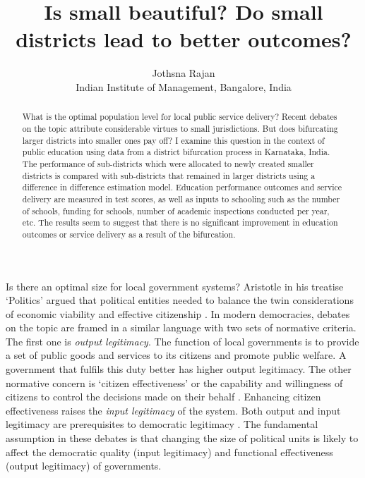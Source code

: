 \documentclass[12pt, a4paper]{article}
\title{Is small beautiful? Do small districts lead to better outcomes?}
\author{Jothsna Rajan \\
	\small{Indian Institute of Management, Bangalore, India}}
\begin{document}

	\maketitle
\begin{abstract}
	What is the optimal population level for local public service delivery? Recent debates on the topic attribute considerable virtues to small jurisdictions. But does bifurcating larger districts into smaller ones pay off? I examine this question in the context of public education using data from a district bifurcation process in Karnataka, India. The performance of sub-districts which were allocated to newly created smaller districts is compared with sub-districts that remained in larger districts using a difference in difference estimation model. Education performance outcomes and service delivery are measured in test scores, as well as inputs to schooling such as the number of schools, funding for schools, number of academic inspections conducted per year, etc. The results seem to suggest that there is no significant improvement in education outcomes or service delivery as a result of the bifurcation. 
\end{abstract}
\paragraph{} Is there an optimal size for local government systems? Aristotle in his treatise `Politics' argued that political entities needed to balance the twin considerations of economic viability and effective citizenship \parencite{aristotle_politics_1984}. In modern democracies, debates on the topic are framed in a similar language with two sets of normative criteria. The first one is \textit{output legitimacy}. The function of local governments is to provide a set of public goods and services to its citizens and promote public welfare. A government that fulfils this duty better has higher output legitimacy. The other normative concern is `citizen effectiveness' or the capability and willingness of citizens to control the decisions made on their behalf \parencite{dahl_size_1973}. Enhancing citizen effectiveness raises the \textit{input legitimacy} of the system. Both output and input legitimacy are prerequisites to democratic legitimacy \parencite{scharpf_governing_1999}. The fundamental assumption in these debates is that changing the size of political units is likely to affect the democratic quality (input legitimacy) and functional effectiveness (output legitimacy) of governments. 
	
\end{document}

